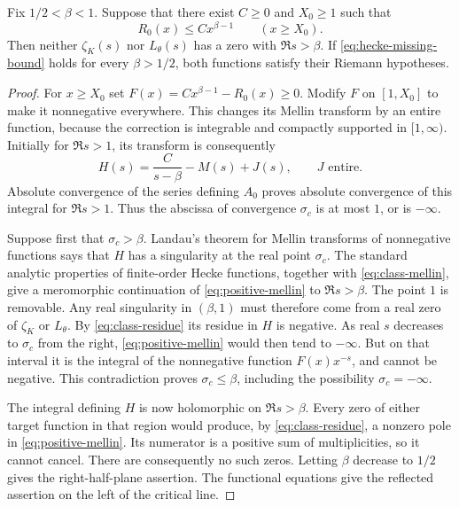 \begin{theorem}\label{thm:hecke-bridge}
Fix $1/2<\beta<1$. Suppose that there exist $C\geq0$ and $X_0\geq1$
such that
\begin{equation}\label{eq:hecke-missing-bound}
 R_0(x)\leq Cx^{\beta-1}\qquad(x\geq X_0).
\end{equation}
Then neither $\zeta_K(s)$ nor $L_\theta(s)$ has a zero with
$\Re s>\beta$. If \eqref{eq:hecke-missing-bound} holds for every
$\beta>1/2$, both functions satisfy their Riemann hypotheses.
\end{theorem}

\begin{proof}
For $x\geq X_0$ set $F(x)=Cx^{\beta-1}-R_0(x)\geq0$. Modify $F$ on
$[1,X_0]$ to make it nonnegative everywhere. This changes its Mellin
transform by an entire function, because the correction is integrable
and compactly supported in $[1,\infty)$. Initially for $\Re s>1$, its
transform is consequently
\begin{equation}\label{eq:positive-mellin}
 H(s)=\frac{C}{s-\beta}-M(s)+J(s),
 \qquad J\text{ entire}.
\end{equation}
Absolute convergence of the series defining $A_0$ proves absolute
convergence of this integral for $\Re s>1$. Thus the abscissa of
convergence $\sigma_c$ is at most $1$, or is $-\infty$.

Suppose first that $\sigma_c>\beta$. Landau's theorem for Mellin
transforms of nonnegative functions says that $H$ has a singularity
at the real point $\sigma_c$. The standard analytic properties of
finite-order Hecke functions, together with \eqref{eq:class-mellin},
give a meromorphic continuation of \eqref{eq:positive-mellin} to
$\Re s>\beta$. The point $1$ is removable. Any real singularity in
$(\beta,1)$ must therefore come from a real zero of $\zeta_K$ or
$L_\theta$. By \eqref{eq:class-residue} its residue in $H$ is negative.
As real $s$ decreases to $\sigma_c$ from the right,
\eqref{eq:positive-mellin} would then tend to $-\infty$. But on that
interval it is the integral of the nonnegative function $F(x)x^{-s}$,
and cannot be negative. This contradiction proves
$\sigma_c\leq\beta$, including the possibility $\sigma_c=-\infty$.

The integral defining $H$ is now holomorphic on $\Re s>\beta$.
Every zero of either target function in that region would produce,
by \eqref{eq:class-residue}, a nonzero pole in
\eqref{eq:positive-mellin}. Its numerator is a positive sum of
multiplicities, so it cannot cancel. There are consequently no such
zeros. Letting $\beta$ decrease to $1/2$ gives the right-half-plane
assertion. The functional equations give the reflected assertion
on the left of the critical line.
\end{proof}

